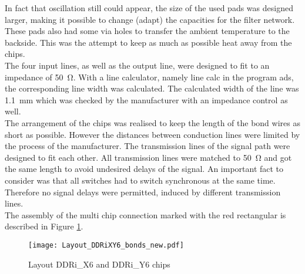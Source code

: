 In fact that oscillation still could appear, the size of the used pads was designed larger, making it possible to change (adapt) the capacities for the filter network.
These pads also had some via holes to transfer the ambient temperature to the backside.
This was the attempt to keep as much as possible heat away from the chips.\\
The four input lines, as well as the output line, were designed to fit to an impedance of \SI{50}{\ohm}.
With a line calculator, namely line calc in the program ads, the corresponding line width was calculated.
The calculated width of the line was \SI{1.1}{\milli \meter} which was checked by the manufacturer with an impedance control as well.\\
The arrangement of the chips was realised to keep the length of the bond wires as short as possible.
However the distances between conduction lines were limited by the process of the manufacturer.
The transmission lines of the signal path were designed to fit each other.
All transmission lines were matched to \SI{50}{\ohm} and got the same length to avoid undesired delays of the signal.
An important fact to consider was that all switches had to switch synchronous at the same time. 
Therefore no signal delays were permitted, induced by different transmission lines.\\
The assembly of the multi chip connection marked with the red rectangular is described in Figure \ref{fig:layoutDDRiXY6bond}.

\begin{figure}[htb!]
	\centering
  \texttt{[image: Layout\_DDRiXY6\_bonds\_new.pdf]}
	\caption{Layout DDRi\_X6 and DDRi\_Y6 chips}
	\label{fig:layoutDDRiXY6bond}
\end{figure}

